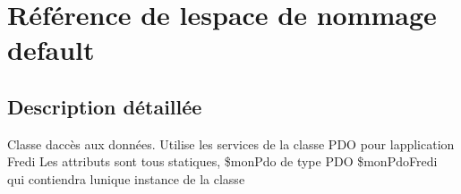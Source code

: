 \hypertarget{namespacedefault}{}\section{Référence de l\textquotesingle{}espace de nommage default}
\label{namespacedefault}


\subsection{Description détaillée}
Classe d\textquotesingle{}accès aux données. Utilise les services de la classe P\+D\+O pour l\textquotesingle{}application Fredi Les attributs sont tous statiques, \$mon\+Pdo de type P\+D\+O \$mon\+Pdo\+Fredi qui contiendra l\textquotesingle{}unique instance de la classe 